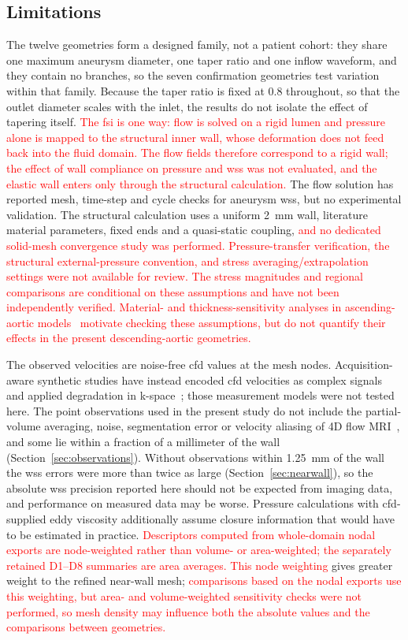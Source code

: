 \documentclass[12pt,a4paper]{article}
\newcommand{\cfdrevision}[1]{\textcolor{red}{#1}}
\newcommand{\CFD}{\ac{cfd}\xspace}
\newcommand{\FSI}{\ac{fsi}\xspace}
\newcommand{\WSS}{\ac{wss}\xspace}
\theoremstyle{definition}
\numberwithin{equation}{section}
\begin{document}
\subsection{Limitations}
\label{Limitations}
The twelve geometries form a designed family, not a patient cohort: they share one maximum aneurysm diameter, one taper ratio and one inflow waveform, and they contain no branches, so the seven confirmation geometries test variation within that family. Because the taper ratio is fixed at 0.8 throughout, so that the outlet diameter scales with the inlet, the results do not isolate the effect of tapering itself. \cfdrevision{The \FSI is one way: flow is solved on a rigid lumen and pressure alone is mapped to the structural inner wall, whose deformation does not feed back into the fluid domain.} \cfdrevision{The flow fields therefore correspond to a rigid wall; the effect of wall compliance on pressure and \WSS was not evaluated, and the elastic wall enters only through the structural calculation.} The flow solution has reported mesh, time-step and cycle checks for aneurysm \WSS, but no experimental validation. The structural calculation uses a uniform 2~mm wall, literature material parameters, fixed ends and a quasi-static coupling, \cfdrevision{and no dedicated solid-mesh convergence study was performed. Pressure-transfer verification, the structural external-pressure convention, and stress averaging/extrapolation settings were not available for review. The stress magnitudes and regional comparisons are conditional on these assumptions and have not been independently verified. Material- and thickness-sensitivity analyses in ascending-aortic models~\cite{zhu2025material} motivate checking these assumptions, but do not quantify their effects in the present descending-aortic geometries.}

The observed velocities are noise-free \CFD values at the mesh nodes. Acquisition-aware synthetic studies have instead encoded \CFD velocities as complex signals and applied degradation in k-space~\cite{ferdian2020fourflownet,saitta2024implicit}; those measurement models were not tested here. The point observations used in the present study do not include the partial-volume averaging, noise, segmentation error or velocity aliasing of 4D flow MRI~\cite{markl2012fourd}, and some lie within a fraction of a millimeter of the wall (Section~\ref{sec:observations}). Without observations within 1.25~mm of the wall the \WSS errors were more than twice as large (Section~\ref{sec:nearwall}), so the absolute \WSS precision reported here should not be expected from imaging data, and performance on measured data may be worse. Pressure calculations with \CFD-supplied eddy viscosity additionally assume closure information that would have to be estimated in practice. \cfdrevision{Descriptors computed from whole-domain nodal exports are node-weighted rather than volume- or area-weighted; the separately retained D1--D8 summaries are area averages. This node weighting} gives greater weight to the refined near-wall mesh; \cfdrevision{comparisons based on the nodal exports use this weighting, but area- and volume-weighted sensitivity checks were not performed, so mesh density may influence both the absolute values and the comparisons between geometries.}
\end{document}
